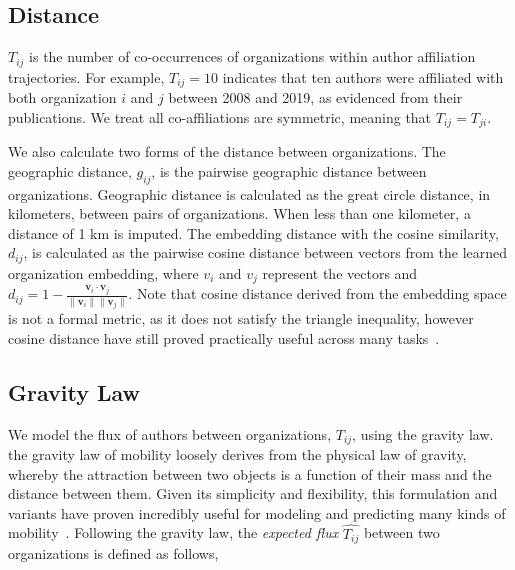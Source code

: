 \documentclass[12pt]{article} %
\begin{document}
%
%
\subsection*{Distance}
$T_{ij}$ is the number of co-occurrences of organizations within author affiliation trajectories.
For example, $T_{ij} = 10$ indicates that ten authors were affiliated with both organization $i$ and $j$ between 2008 and 2019, as evidenced from their publications.
We treat all co-affiliations are symmetric, meaning that $T_{ij} = T_{ji}$.

We also calculate two forms of the distance between organizations.
The geographic distance, $g_{ij}$, is the pairwise geographic distance between organizations.
Geographic distance is calculated as the great circle distance, in kilometers, between pairs of organizations.
When less than one kilometer, a distance of 1 km is imputed.
The embedding distance with the cosine similarity, $d_{ij}$, is calculated as the pairwise cosine distance between vectors from the learned organization embedding, where $v_{i}$ and $v_{j}$ represent the vectors and $d_{ij} = 1 - \frac{\bm{v}_{i} \cdot \bm{v}_{j}}{\lVert \bm{v}_{i} \rVert \lVert \bm{v}_{j} \rVert}$.
Note that cosine distance derived from the embedding space is not a formal metric, as it does not satisfy the triangle inequality, however cosine distance have still proved practically useful across many tasks~\autocite{lerman2007embedding, brown1970migration, brown1970functional, kim2018functional}. 



%
%
\subsection*{Gravity Law}

We model the flux of authors between organizations, $T_{ij}$, using the gravity law.
the gravity law of mobility loosely derives from the physical law of gravity, whereby the attraction between two objects is a function of their mass and the distance between them.
Given its simplicity and flexibility, this formulation and variants have proven incredibly useful for modeling and predicting many kinds of mobility~\autocite{jung2008highwaygravity, curiel2018citygravity, lewer2008immigrationgravity, xia2005measlesgravity, truscott2012epidemicgravity, hong2016busgravity}.
Following the gravity law, the \textit{expected flux} $\hat{T_{ij}}$ between two organizations is defined as follows,
\end{document}
